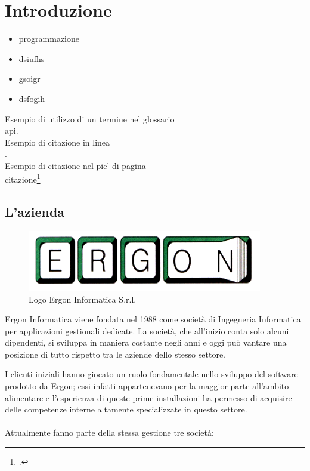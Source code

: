 
\chapter{Introduzione}
\label{cap:introduzione}
\begin{itemize}
  \item programmazione
  \item dsiufhs
  \item gsoigr
  \item dsfogih
\end{itemize}
\noindent Esempio di utilizzo di un termine nel glossario \\
\gls{api}. \\

\noindent Esempio di citazione in linea \\
\cite{site:agile-manifesto}. \\

\noindent Esempio di citazione nel pie' di pagina \\
citazione\footcite{womak:lean-thinking} \\

\section{L'azienda}

\begin{figure}[h]
    \centering
    \includegraphics[scale = 1.1]{../images/logo_ergon.png}
    \caption{Logo Ergon Informatica S.r.l.}
    \label{logo_ergon}
  \end{figure}

Ergon Informatica viene fondata nel 1988 come società di Ingegneria Informatica per applicazioni gestionali dedicate.
La società, che all'inizio conta solo alcuni dipendenti, si sviluppa in maniera costante negli anni e oggi può vantare 
una posizione di tutto rispetto tra le aziende dello stesso settore.

I clienti iniziali hanno giocato un ruolo fondamentale nello sviluppo del software prodotto da Ergon; essi infatti 
appartenevano per la maggior parte all'ambito alimentare e l'esperienza di queste prime installazioni ha permesso di 
acquisire delle competenze interne altamente specializzate in questo settore.
\\\\
Attualmente fanno parte della stessa gestione tre società:


